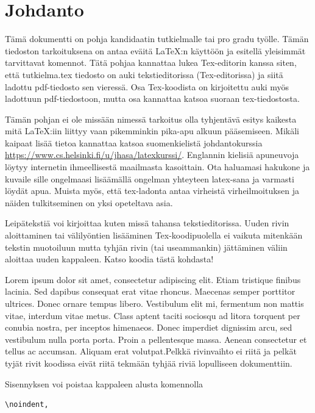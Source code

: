 \documentclass[a4paper,12 pt]{article}
\theoremstyle{plain}
\theoremstyle{definition}
\theoremstyle{remark}
\numberwithin{equation}{section}
\numberwithin{figure}{section}
\begin{document}
\newpage
\section*{Johdanto}

Tämä dokumentti on pohja kandidaatin tutkielmalle tai pro gradu työlle. Tämän tiedoston tarkoituksena on antaa eväitä \LaTeX :n käyttöön ja esitellä yleisimmät tarvittavat komennot. Tätä pohjaa kannattaa lukea Tex-editorin kanssa siten, että tutkielma.tex tiedosto on auki tekstieditorissa (Tex-editorissa) ja siitä ladottu pdf-tiedosto sen vieressä. Osa Tex-koodista on kirjoitettu auki myös ladottuun pdf-tiedostoon, mutta osa kannattaa katsoa suoraan tex-tiedostosta.

Tämän pohjan ei ole missään nimessä tarkoitus olla tyhjentävä esitys kaikesta mitä \LaTeX :iin liittyy vaan pikemminkin pika-apu alkuun pääsemiseen. Mikäli kaipaat lisää tietoa kannattaa katsoa suomenkielistä johdantokurssia \url{https://www.cs.helsinki.fi/u/jhasa/latexkurssi/}. Englannin kielisiä apuneuvoja löytyy internetin ihmeellisestä maailmasta kasoittain. Ota haluamasi hakukone
 ja kuvaile sille ongelmaasi lisäämällä ongelman yhteyteen latex-sana ja varmasti löydät apua. Muista myös, että tex-ladonta antaa virheistä virheilmoituksen ja näiden tulkitseminen on yksi opeteltava asia. 

Leipätekstiä voi kirjoittaa kuten missä tahansa tekstieditorissa.
Uuden rivin aloittaminen tai välilyöntien lisääminen Tex-koodipuolella ei vaikuta mitenkään tekstin muotoiluun mutta tyhjän rivin (tai useammankin) jättäminen väliin aloittaa uuden kappaleen. Katso koodia tästä kohdasta!


Lorem ipsum dolor sit amet, consectetur adipiscing elit. Etiam tristique finibus lacinia. Sed dapibus consequat erat vitae rhoncus. Maecenas semper porttitor ultrices. Donec ornare tempus libero. Vestibulum elit mi, fermentum non mattis vitae, interdum vitae metus. Class aptent taciti sociosqu ad litora torquent per conubia nostra, per inceptos himenaeos. Donec imperdiet dignissim arcu, sed vestibulum nulla porta porta. Proin a pellentesque massa. Aenean consectetur et tellus ac accumsan. Aliquam erat volutpat.Pelkkä rivinvaihto ei riitä ja pelkät tyjät rivit koodissa eivät riitä tekmään tyhjää riviä lopulliseen dokumenttiin.

\indent Sisennyksen voi poistaa kappaleen alusta komennolla

\begin{verbatim}
\noindent,
\end{verbatim}
\end{document}
